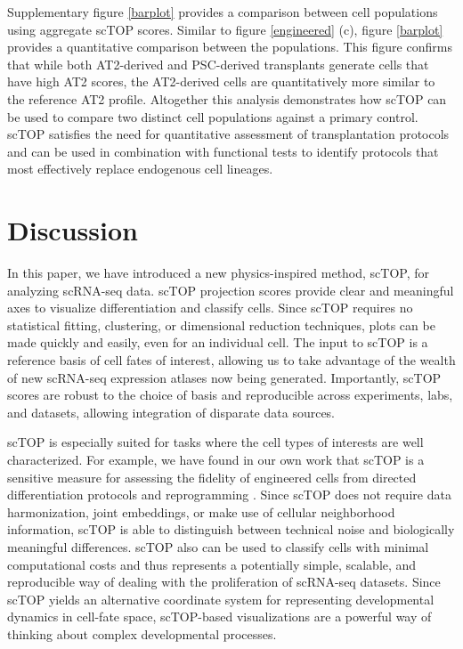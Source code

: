 \documentclass[vruler,JEB]{COB}%
\begin{document}
Supplementary figure \ref{barplot} provides a comparison between cell populations using aggregate scTOP scores. Similar to figure \ref{engineered} (c), figure \ref{barplot} provides a quantitative comparison between the populations. This figure confirms that while both AT2-derived and PSC-derived transplants generate cells that have high AT2 scores, the AT2-derived cells are quantitatively more similar to the reference AT2 profile. Altogether this analysis demonstrates how scTOP can be used to compare two distinct cell populations against a primary control. scTOP satisfies the need for quantitative assessment of transplantation protocols and can be used in combination with functional tests to identify protocols that most effectively replace endogenous cell lineages. 

\section{Discussion}

In this paper, we have introduced a new physics-inspired method, scTOP, for analyzing scRNA-seq data. scTOP projection scores provide clear and meaningful axes to visualize differentiation and classify cells. Since scTOP requires no statistical fitting, clustering, or dimensional reduction techniques, plots can be made quickly and easily, even for an individual cell. The input to scTOP is a reference basis of cell fates of interest, allowing us to take advantage of the wealth of new scRNA-seq expression atlases now being generated. Importantly, scTOP scores are robust to the choice of basis and reproducible across experiments, labs, and datasets, allowing integration of disparate data sources.

scTOP is especially suited for tasks where the cell types of interests are well characterized. For example, we have found in our own work that scTOP is a sensitive measure for assessing the fidelity of engineered cells from directed differentiation protocols and reprogramming \citep{herriges_durable_2022}. Since scTOP does not require data harmonization, joint embeddings, or make use of cellular neighborhood information,  scTOP is able to distinguish between technical noise and biologically meaningful differences. scTOP also can be used to classify cells with minimal computational costs and thus represents a potentially simple, scalable, and reproducible way of dealing with the proliferation of scRNA-seq datasets. Since scTOP yields an alternative coordinate system for representing developmental dynamics in cell-fate space, scTOP-based visualizations are a powerful way of thinking about complex developmental processes.
\end{document}

